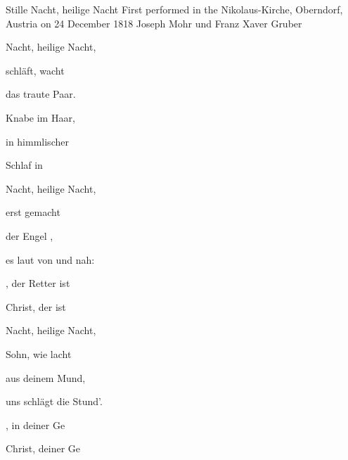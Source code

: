 \begin{SBSong}{Stille Nacht, heilige Nacht}
    {First performed in the Nikolaus-Kirche, Oberndorf, Austria on 24 December 1818}
    {Joseph Mohr und Franz Xaver Gruber}
  \begin{SBVerse}
	 Nacht, heilige Nacht,
	
	 schl\"aft,  wacht
	
	 das traute  Paar.
	
	 Knabe im  Haar,

	 in himmlischer 

    Schlaf in  
  \end{SBVerse}
  \begin{SBVerse}
	 Nacht, heilige Nacht,
	
	 erst gemacht

	 der Engel ,

	 es laut von  und nah:

	, der Retter ist 

    Christ, der  ist 
  \end{SBVerse}
  \begin{SBVerse}
	 Nacht, heilige Nacht,
	
	 Sohn,  wie lacht

	 aus deinem  Mund,

	 uns schl\"agt die  Stund'.

	, in deiner Ge

    Christ,  deiner Ge
  \end{SBVerse}
\end{SBSong}
